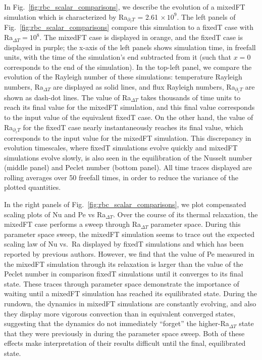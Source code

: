 \documentclass[aps, pre, onecolumn, nofootinbib, notitlepage, groupedaddress, amsfonts, amssymb, amsmath, longbibliography, superscriptaddress]{revtex4-1}
\begin{document}
In Fig.~\ref{fig:rbc_scalar_comparisons}, we describe the evolution of a mixedFT simulation which is characterized by Ra$_{\partial_z T}$ = 2.61$\,\times 10^9$.
The left panels of Fig.~\ref{fig:rbc_scalar_comparisons} compare this simulation to a fixedT case with Ra$_{\Delta T} = 10^8$.
The mixedFT case is displayed in orange, and the fixedT case is displayed in purple; the x-axis of the left panels shows simulation time, in freefall units, with the time of the simulation's end subtracted from it (such that $x = 0$ corresponds to the end of the simulation).
In the top-left panel, we compare the evolution of the Rayleigh number of these simulations: temperature Rayleigh numbers, Ra$_{\Delta T}$ are displayed as solid lines, and flux Rayleigh numbers, Ra$_{\partial_z T}$ are shown as dash-dot lines.
The value of Ra$_{\Delta T}$ takes thousands of time units to reach its final value for the mixedFT simulation, and this final value corresponds to the input value of the equivalent fixedT case.
On the other hand, the value of Ra$_{\partial_z T}$ for the fixedT case nearly instantaneously reaches its final value, which corresponds to the input value for the mixedFT simulation.
This discrepancy in evolution timescales, where fixedT simulations evolve quickly and mixedFT simulations evolve slowly, is also seen in the equilibration of the Nusselt number (middle panel) and Peclet number (bottom panel).
All time traces displayed are rolling averages over 50 freefall times, in order to reduce the variance of the plotted quantities.

In the right panels of Fig.~\ref{fig:rbc_scalar_comparisons}, we plot compensated scaling plots of Nu and Pe vs Ra$_{\Delta T}$.
Over the course of its thermal relaxation, the mixedFT case performs a sweep through Ra$_{\Delta T}$ parameter space.
During this parameter space sweep, the mixedFT simulation seems to trace out the expected scaling law of Nu vs.~Ra displayed by fixedT simulations and which has been reported by previous authors.
However, we find that the value of Pe measured in the mixedFT simulation through its relaxation  is larger than the value of the Peclet number in comparison fixedT simulations until it converges to its final state.
These traces through parameter space demonstrate the importance of waiting until a mixedFT simulation has reached its equilibrated state.
During the rundown, the dynamics in mixedFT simulations are constantly evolving, and also they display more vigorous convection than in equivalent converged states, suggesting that the dynamics do not immediately ``forget'' the higher-Ra$_{\Delta T}$ state that they were previously in during the parameter space sweep.
Both of these effects make interpretation of their results difficult until the final, equilibrated state.
\end{document}
